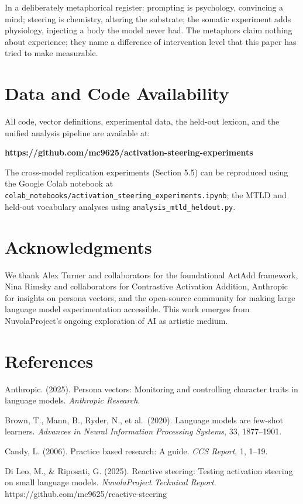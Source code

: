 \documentclass[11pt,a4paper]{article}
\begin{document}
In a deliberately metaphorical register: prompting is psychology, convincing a mind; steering is chemistry, altering the substrate; the somatic experiment adds physiology, injecting a body the model never had. The metaphors claim nothing about experience; they name a difference of intervention level that this paper has tried to make measurable.

\section*{Data and Code Availability}

All code, vector definitions, experimental data, the held-out lexicon, and the unified analysis pipeline are available at:

\textbf{https://github.com/mc9625/activation-steering-experiments}

The cross-model replication experiments (Section 5.5) can be reproduced using the Google Colab notebook at \texttt{colab\_notebooks/activation\_steering\_experiments.ipynb}; the MTLD and held-out vocabulary analyses using \texttt{analysis\_mtld\_heldout.py}.

\section*{Acknowledgments}

We thank Alex Turner and collaborators for the foundational ActAdd framework, Nina Rimsky and collaborators for Contrastive Activation Addition, Anthropic for insights on persona vectors, and the open-source community for making large language model experimentation accessible. This work emerges from NuvolaProject's ongoing exploration of AI as artistic medium.

\section*{References}

Anthropic. (2025). Persona vectors: Monitoring and controlling character traits in language models. \emph{Anthropic Research}.

Brown, T., Mann, B., Ryder, N., et al.~(2020). Language models are few-shot learners. \emph{Advances in Neural Information Processing Systems}, 33, 1877--1901.

Candy, L. (2006). Practice based research: A guide. \emph{CCS Report}, 1, 1--19.

Di Leo, M., \& Riposati, G. (2025). Reactive steering: Testing activation steering on small language models. \emph{NuvolaProject Technical Report}. https://github.com/mc9625/reactive-steering
\end{document}
